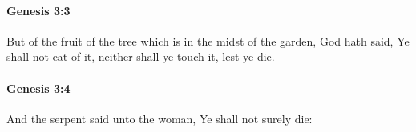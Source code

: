 		\paragraph{Genesis 3:3} %
			\label{GENESIS-3-3}

			But of the fruit of the tree which is in the midst of the garden, God hath said, Ye shall not eat of it, neither shall ye touch it, lest ye die.


		\paragraph{Genesis 3:4} %
			\label{GENESIS-3-4}

			And the serpent said unto the woman, Ye shall not surely die:


